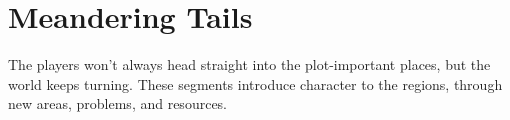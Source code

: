 \section{Meandering Tails}
\label{feyClosingThreads}

\noindent
The players won't always head straight into the plot-important places, but the world keeps turning.
These \glspl{segment} introduce character to the \glspl{region}, through new areas, problems, and resources.

